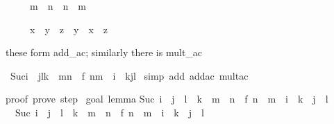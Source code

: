 \begin{isabellebody}
\begin{isamarkuptext}
\begin{isabelle}%
\ \ \ \ \ m\ {\isacharplus}\ n\ {\isacharequal}\ n\ {\isacharplus}\ m%
\end{isabelle}

\begin{isabelle}%
\ \ \ \ \ x\ {\isacharplus}\ {\isacharparenleft}y\ {\isacharplus}\ z{\isacharparenright}\ {\isacharequal}\ y\ {\isacharplus}\ {\isacharparenleft}x\ {\isacharplus}\ z{\isacharparenright}%
\end{isabelle}

these form add_ac; similarly there is mult_ac%
\end{isamarkuptext}%
\ {\isachardoublequote}Suc{\isacharparenleft}i\ {\isacharplus}\ j{\isacharasterisk}l{\isacharasterisk}k\ {\isacharplus}\ m{\isacharasterisk}n{\isacharparenright}\ {\isacharequal}\ f\ {\isacharparenleft}n{\isacharasterisk}m\ {\isacharplus}\ i\ {\isacharplus}\ k{\isacharasterisk}j{\isacharasterisk}l{\isacharparenright}{\isachardoublequote}\isanewline
{}\ {\isacharparenleft}simp\ add{\isacharcolon}\ add{\isacharunderscore}ac\ mult{\isacharunderscore}ac{\isacharparenright}\isanewline
{}%
\begin{isamarkuptext}%
proof\ {\isacharparenleft}prove{\isacharparenright}{\isacharcolon}\ step\ {}\isanewline
\isanewline
goal\ {\isacharparenleft}lemma{\isacharparenright}{\isacharcolon}\isanewline
Suc\ {\isacharparenleft}i\ {\isacharplus}\ j\ {\isacharasterisk}\ l\ {\isacharasterisk}\ k\ {\isacharplus}\ m\ {\isacharasterisk}\ n{\isacharparenright}\ {\isacharequal}\ f\ {\isacharparenleft}n\ {\isacharasterisk}\ m\ {\isacharplus}\ i\ {\isacharplus}\ k\ {\isacharasterisk}\ j\ {\isacharasterisk}\ l{\isacharparenright}\isanewline
\ {}{\isachardot}\ Suc\ {\isacharparenleft}i\ {\isacharplus}\ j\ {\isacharasterisk}\ l\ {\isacharasterisk}\ k\ {\isacharplus}\ m\ {\isacharasterisk}\ n{\isacharparenright}\ {\isacharequal}\ f\ {\isacharparenleft}n\ {\isacharasterisk}\ m\ {\isacharplus}\ i\ {\isacharplus}\ k\ {\isacharasterisk}\ j\ {\isacharasterisk}\ l{\isacharparenright}


\end{isamarkuptext}
\end{isabellebody}
